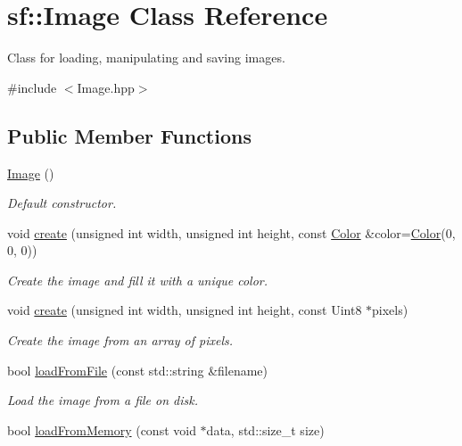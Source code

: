 \hypertarget{classsf_1_1_image}{\section{sf\+:\+:Image Class Reference}
\label{classsf_1_1_image}
}


Class for loading, manipulating and saving images.  




{\ttfamily \#include $<$Image.\+hpp$>$}

\subsection*{Public Member Functions}
\begin{DoxyCompactItemize}
\item 
\hyperlink{classsf_1_1_image_abb4caf3cb167b613345ebe36fc883f12}{Image} ()
\begin{DoxyCompactList}\small\item\em Default constructor. \end{DoxyCompactList}\item 
void \hyperlink{classsf_1_1_image_a2a67930e2fd9ad97cf004e918cf5832b}{create} (unsigned int width, unsigned int height, const \hyperlink{classsf_1_1_color}{Color} \&color=\hyperlink{classsf_1_1_color}{Color}(0, 0, 0))
\begin{DoxyCompactList}\small\item\em Create the image and fill it with a unique color. \end{DoxyCompactList}\item 
void \hyperlink{classsf_1_1_image_a1c2b960ea12bdbb29e80934ce5268ebf}{create} (unsigned int width, unsigned int height, const Uint8 $\ast$pixels)
\begin{DoxyCompactList}\small\item\em Create the image from an array of pixels. \end{DoxyCompactList}\item 
bool \hyperlink{classsf_1_1_image_a9e4f2aa8e36d0cabde5ed5a4ef80290b}{load\+From\+File} (const std\+::string \&filename)
\begin{DoxyCompactList}\small\item\em Load the image from a file on disk. \end{DoxyCompactList}\item 
bool \hyperlink{classsf_1_1_image_aaa6c7afa5851a51cec6ab438faa7354c}{load\+From\+Memory} (const void $\ast$data, std\+::size\+\_\+t size)

\end{DoxyCompactItemize}
